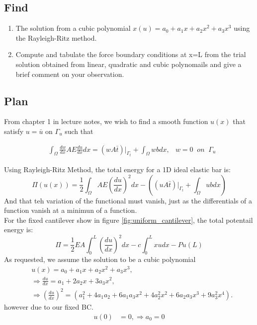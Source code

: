 \documentclass[a4paper]{memoir}
\begin{document}
\subsection{Find}
\begin{enumerate}
	\item The solution from a cubic polynomial $x(u) = a_0+a_1x+a_2x^2+a_3x^3$ using the Rayleigh-Ritz method.
	\item Compute and tabulate the force boundary conditions at x=L from the trial solution obtained from linear, quadratic and cubic polynomails and give a brief comment on your observation.
\end{enumerate}

\subsection{Plan}
From chapter 1 in lecture notes, we wish to find a smooth function $u(x)$ that satisfy $u = \bar{u}$ on $\Gamma_u$ such that

\begin{align*}
	&\int_\Omega \frac{dw}{dx} AE \frac{du}{dx} dx = (wA\bar{t})|_{\Gamma_t} + \int_\Omega wb dx,  & w = 0 \;\; on \;\; \Gamma_u
\end{align*}

Using Rayleigh-Ritz Method, the total energy for a 1D ideal elastic bar is:
\begin{equation}
	\Pi(u(x)) = \frac{1}{2} \int_\Omega AE \left( \frac{du}{dx} \right)^2 dx-\left( (uA\bar{t})|_{\Gamma_t} + \int_\Omega ub dx \right)
	\label{eq:cantilever_prob_eq}
\end{equation}
And that teh variation of the functional must vanish, just as the differentials of a function vanish at a minimun of a function. \\
For the fixed cantilever show in figure \ref{fig:uniform_cantilever}, the total potentail energy is:
\begin{equation}
	\Pi = \frac{1}{2} EA \int^L_0 \left( \frac{du}{dx} \right)^2 dx - c \int^L_0 xudx - Pu(L)
	\label{eq:ubeam_potencial_energy}
\end{equation}
As requested, we assume the solution to be a cubic polynomial
\begin{align*}
	 & u(x) = a_0+a_1x+a_2x^2+a_3x^3,\\ & \Rightarrow \frac{du}{dx} = a_1+2a_2x+3a_3x^2, \\
	 & \Rightarrow \left( \frac{du}{dx} \right)^2 = (a_1^2+4a_1a_2+6a_1a_3x^2+4a_2^2x^2+6a_2a_3x^3+9a_3^2x^4).
\end{align*}
however due to our fixed BC.
\begin{align*}
	 u(0) &= 0, \Rightarrow  a_0 = 0
\end{align*}
\end{document}

